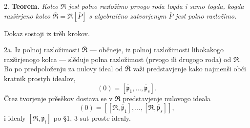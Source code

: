 \documentclass[11pt]{article}
\begin{document}
\setcounter{footnote}{22}

2. \textbf{Teorem.} \emph{Kolco $\mathfrak R$ jest polno razložimo prvogo roda togda i samo togda, kogda razširjeno kolco $\overline{\mathfrak R}=\mathfrak R[\overline P]$ s algebraično zatvorjenym $\overline P$ jest polno razložimo.}

Dokaz sostoji iz trěh krokov.

2a. Iz polnoj razložimosti $\overline{\mathfrak R}$ --- občneje, iz polnoj razložimosti libokakogo razširjenogo kolca --- slěduje polna razložimost (prvogo ili drugogo roda) od $\mathfrak R$. Bo po predpoloženju za nulovy ideal od $\overline{\mathfrak R}$ važi predstavjenje kako najmenši obči kratnik prostyh idealov,
\[
        (0)=[\overline{\mathfrak p}_1,\ldots,\overline{\mathfrak p}_s].
\]
Črez tvorjenje prěsěkov dostava se v $\mathfrak R$ predstavjenje nulovogo ideala
\[
        (0)=[[\mathfrak R,\overline{\mathfrak p}_1],\ldots,[\mathfrak R,\overline{\mathfrak p}_s]],
\]
i idealy $[\mathfrak R,\overline{\mathfrak p}_i]$ po \S 1, 3 sut proste idealy.
\end{document}
